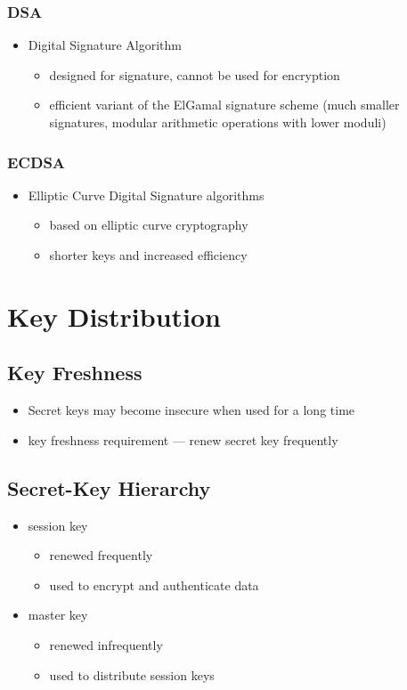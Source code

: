 \documentclass[draft]{article}
\begin{document}
\subsubsection*{DSA}
\begin{itemize}[nosep]
    \item Digital Signature Algorithm
          \begin{itemize}[nosep]
              \item designed for signature, cannot be used for encryption
              \item efficient variant of the ElGamal signature scheme (much smaller signatures, modular arithmetic operations with lower moduli)
          \end{itemize}
\end{itemize}
\subsubsection*{ECDSA}
\begin{itemize}
    \item Elliptic Curve Digital Signature algorithms
          \begin{itemize}[nosep]
              \item based on elliptic curve cryptography
              \item shorter keys and increased efficiency
          \end{itemize}
\end{itemize}
\section{Key Distribution}
\subsection{Key Freshness}
\begin{itemize}[nosep]
    \item Secret keys may become insecure when used for a long time
    \item key freshness requirement --- renew secret key frequently
\end{itemize}
\subsection{Secret-Key Hierarchy}
\begin{itemize}[nosep]
    \item session key
          \begin{itemize}[nosep]
              \item renewed frequently
              \item used to encrypt and authenticate data
          \end{itemize}
    \item master key
          \begin{itemize}[nosep]
              \item renewed infrequently
              \item used to distribute session keys
          \end{itemize}
\end{itemize}
\end{document}
